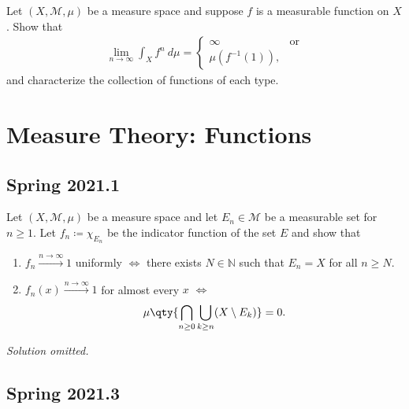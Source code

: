 Let \((X, \mathcal M, \mu)\) be a measure space and suppose \(f\) is a
measurable function on \(X\). Show that
\begin{align*}
\lim _{n \rightarrow \infty} \int_{X} f^{n} ~d \mu =
\begin{cases}
\infty & \text{or} \\
\mu(f^{-1}(1)),
\end{cases}
\end{align*}
and characterize the collection of functions of each type.

\hypertarget{measure-theory-functions}{%
\section{Measure Theory: Functions}\label{measure-theory-functions}}

\hypertarget{spring-2021.1}{%
\subsection{Spring 2021.1}\label{spring-2021.1}}

\begin{problem}[Spring 2021, 1]

Let \((X, \mathcal{M},\mu)\) be a measure space and let
\(E_n \in \mathcal{M}\) be a measurable set for \(n\geq 1\). Let
\(f_n \coloneqq\chi_{E_n}\) be the indicator function of the set \(E\)
and show that

\begin{enumerate}
\def\labelenumi{\alph{enumi}.}
\item
  \(f_n \overset{n\to\infty}\to 1\) uniformly \(\iff\) there exists
  \(N\in {\mathbb{N}}\) such that \(E_n = X\) for all \(n\geq N\).
\item
  \(f_n(x) \overset{n\to\infty}\to 1\) for almost every \(x\) \(\iff\)
  \begin{align*}
  \mu \qty{ \displaystyle\bigcap_{n \geq 0} \displaystyle\bigcup_{k \geq n} (X \setminus E_k) } = 0
  .\end{align*}
\end{enumerate}

\end{problem}

\emph{Solution omitted.}

\hypertarget{spring-2021.3}{%
\subsection{Spring 2021.3}\label{spring-2021.3}}

